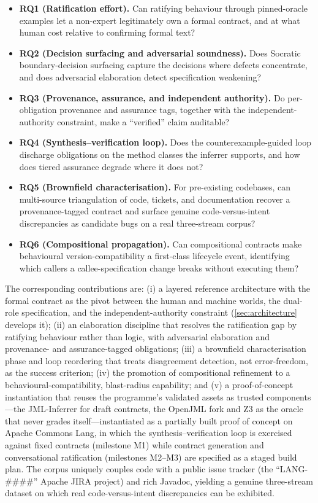 \begin{itemize}
  \item \textbf{RQ1 (Ratification effort).} Can ratifying behaviour through pinned-oracle examples let a non-expert legitimately own a formal contract, and at what human cost relative to confirming formal text?
  \item \textbf{RQ2 (Decision surfacing and adversarial soundness).} Does Socratic boundary-decision surfacing capture the decisions where defects concentrate, and does adversarial elaboration detect specification weakening?
  \item \textbf{RQ3 (Provenance, assurance, and independent authority).} Do per-obligation provenance and assurance tags, together with the independent-authority constraint, make a ``verified'' claim auditable?
  \item \textbf{RQ4 (Synthesis--verification loop).} Does the counterexample-guided loop discharge obligations on the method classes the inferrer supports, and how does tiered assurance degrade where it does not?
  \item \textbf{RQ5 (Brownfield characterisation).} For pre-existing codebases, can multi-source triangulation of code, tickets, and documentation recover a provenance-tagged contract and surface genuine code-versus-intent discrepancies as candidate bugs on a real three-stream corpus?
  \item \textbf{RQ6 (Compositional propagation).} Can compositional contracts make behavioural version-compatibility a first-class lifecycle event, identifying which callers a callee-specification change breaks without executing them?
\end{itemize}

\noindent The corresponding contributions are: (i) a layered reference architecture with the formal contract as the pivot between the human and machine worlds, the dual-role specification, and the independent-authority constraint (\cref{sec:architecture} develops it); (ii) an elaboration discipline that resolves the ratification gap by ratifying behaviour rather than logic, with adversarial elaboration and provenance- and assurance-tagged obligations; (iii) a brownfield characterisation phase and loop reordering that treats disagreement detection, not error-freedom, as the success criterion; (iv) the promotion of compositional refinement to a behavioural-compatibility, blast-radius capability; and (v) a proof-of-concept instantiation that reuses the programme's validated assets as trusted components---the JML-Inferrer for draft contracts, the OpenJML fork and Z3 as the oracle that never grades itself---instantiated as a partially built proof of concept on Apache Commons Lang, in which the synthesis--verification loop is exercised against fixed contracts (milestone M1) while contract generation and conversational ratification (milestones M2--M3) are specified as a staged build plan. The corpus uniquely couples code with a public issue tracker (the ``LANG-\#\#\#\#'' Apache JIRA project) and rich Javadoc, yielding a genuine three-stream dataset on which real code-versus-intent discrepancies can be exhibited.


